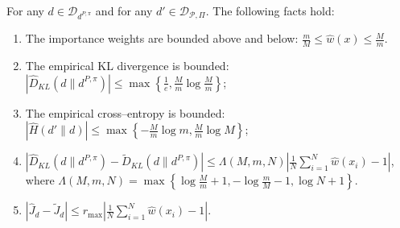 \begin{lemma}
\label{lemma:max}
	For any $d \in \mathcal{D}_{d^{P,\pi}}$ and for any $d' \in \mathcal{D}_{\mathcal{P},\Pi}$. The following facts hold:
	\begin{enumerate}
		\item The importance weights are bounded above and below: $\frac{m}{M} \le \widehat{w}(x) \le \frac{M}{m}$.
		\item The empirical KL divergence is bounded: $\left| \widehat{D}_{KL} (d \| d^{P,\pi}) \right| \le \max \left\{ \frac{1}{e}, \frac{M}{m} \log \frac{M}{m} \right\}$;
		\item The empirical cross--entropy is bounded: $\left| \widehat{H} (d' \| d) \right|  \le \max \left\{ - \frac{M}{m} \log m, \frac{M}{m} \log M \right\}$;
		\item $\left| \widehat{D}_{KL} (d \| d^{P,\pi}) - \widetilde{D}_{KL} (d \| d^{P,\pi}) \right| \le \Lambda(M,m,N) \left| \frac{1}{N} \sum_{i=1}^N \widehat{w}(x_i)- 1 \right| $, where $\Lambda(M,m,N) = \max\left\{ \log \frac{M}{m} + 1,  -\log \frac{m}{M} - 1, \log N + 1 \right\}$.
		\item $\left| \widehat{J}_d - \widetilde{J}_d \right| \le r_{\max} \left| \frac{1}{N} \sum_{i=1}^N \widehat{w}(x_i)- 1 \right| $.
	\end{enumerate}
\end{lemma}

